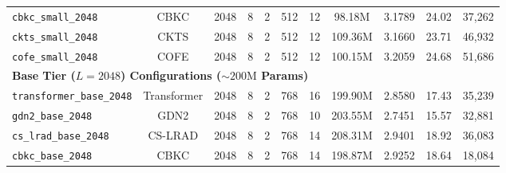 \documentclass[twocolumn,10pt]{article}
\begin{document}
\begin{table}[!htbp]
{\begin{tabular}{lcccccccccc}
\texttt{cbkc\_small\_2048} & CBKC & 2048 & 8 & 2 & 512 & 12 & 98.18M & 3.1789 & 24.02 & 37,262 \\
\texttt{ckts\_small\_2048} & CKTS & 2048 & 8 & 2 & 512 & 12 & 109.36M & 3.1660 & 23.71 & 46,932 \\
\texttt{cofe\_small\_2048} & COFE & 2048 & 8 & 2 & 512 & 12 & 100.15M & 3.2059 & 24.68 & 51,686 \\
\midrule
\multicolumn{11}{l}{\textbf{Base Tier ($L=2048$) Configurations ($\sim 200\text{M}$ Params)}} \\
\texttt{transformer\_base\_2048} & Transformer & 2048 & 8 & 2 & 768 & 16 & 199.90M & 2.8580 & 17.43 & 35,239 \\
\texttt{gdn2\_base\_2048} & GDN2 & 2048 & 8 & 2 & 768 & 10 & 203.55M & 2.7451 & 15.57 & 32,881 \\
\texttt{cs\_lrad\_base\_2048} & CS-LRAD & 2048 & 8 & 2 & 768 & 14 & 208.31M & 2.9401 & 18.92 & 36,083 \\
\texttt{cbkc\_base\_2048} & CBKC & 2048 & 8 & 2 & 768 & 14 & 198.87M & 2.9252 & 18.64 & 18,084 \\
\bottomrule
\end{tabular}%
}
\end{table}

\begin{table}[!htbp]
\centering
\caption{Cross-Platform 32,768-Token Hardware Portability: \texttt{BareTorch-2.5B-Base} vs.\ Native \texttt{Qwen3.5-2B}}
\label{tab:baretorch_2_5b_crossplatform}
\vspace{4pt}
\end{table}
\end{document}
